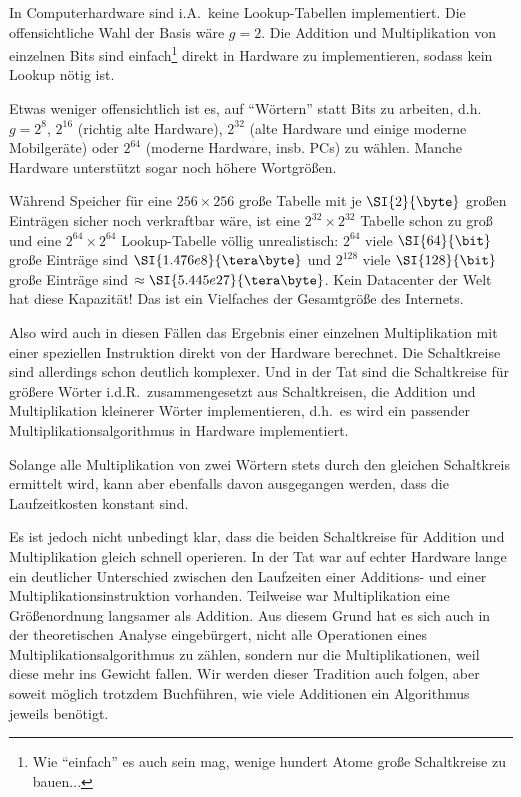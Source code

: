 \begin{remark}
    In Computerhardware sind i.A.\ keine Lookup-Tabellen implementiert. Die offensichtliche Wahl der Basis wäre $g=2$. Die Addition und Multiplikation von einzelnen Bits sind einfach\footnote{Wie \enquote{einfach} es auch sein mag, wenige hundert Atome große Schaltkreise zu bauen...} direkt in Hardware zu implementieren, sodass kein Lookup nötig ist.

    \smallskip
    Etwas weniger offensichtlich ist es, auf \enquote{Wörtern} statt Bits zu arbeiten, d.h. $g=2^8$, $2^{16}$ (richtig alte Hardware), $2^{32}$ (alte Hardware und einige moderne Mobilgeräte) oder $2^{64}$ (moderne Hardware, insb. PCs) zu wählen. Manche Hardware unterstützt sogar noch höhere Wortgrößen.

    \smallskip
    Während Speicher für eine $256\times 256$ große Tabelle mit je $\SI{2}{\byte}$ großen Einträgen sicher noch verkraftbar wäre, ist eine $2^{32}\times 2^{32}$ Tabelle schon zu groß und eine $2^{64}\times 2^{64}$  Lookup-Tabelle völlig unrealistisch: $2^{64}$ viele $\SI{64}{\bit}$ große Einträge sind $\SI{1.476e8}{\tera\byte}$ und $2^{128}$ viele $\SI{128}{\bit}$ große Einträge sind $\approx \SI{5.445e27}{\tera\byte}$. Kein Datacenter der Welt hat diese Kapazität! Das ist ein Vielfaches der Gesamtgröße des Internets.

    \smallskip
    Also wird auch in diesen Fällen das Ergebnis einer einzelnen Multiplikation mit einer speziellen Instruktion direkt von der Hardware berechnet. Die Schaltkreise sind allerdings schon deutlich komplexer. Und in der Tat sind die Schaltkreise für größere Wörter i.d.R.\ zusammengesetzt aus Schaltkreisen, die Addition und Multiplikation kleinerer Wörter implementieren, d.h.\ es wird ein passender Multiplikationsalgorithmus in Hardware implementiert.

    \smallskip
    Solange alle Multiplikation von zwei Wörtern stets durch den gleichen Schaltkreis ermittelt wird, kann aber ebenfalls davon ausgegangen werden, dass die Laufzeitkosten konstant sind.

    \medskip
    Es ist jedoch nicht unbedingt klar, dass die beiden Schaltkreise für Addition und Multiplikation gleich schnell operieren. In der Tat war auf echter Hardware lange ein deutlicher Unterschied zwischen den Laufzeiten einer Additions- und einer Multiplikationsinstruktion vorhanden. Teilweise war Multiplikation eine Größenordnung langsamer als Addition. Aus diesem Grund hat es sich auch in der theoretischen Analyse eingebürgert, nicht alle Operationen eines Multiplikationsalgorithmus zu zählen, sondern nur die Multiplikationen, weil diese mehr ins Gewicht fallen. Wir werden dieser Tradition auch folgen, aber soweit möglich trotzdem Buchführen, wie viele Additionen ein Algorithmus jeweils benötigt.
\end{remark}

